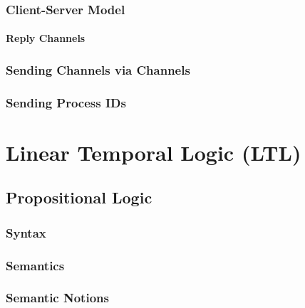 \documentclass[a4paper, 11pt, accentcolor = tud3b]{tudreport}
\begin{document}
            \subsection{Client-Server Model} %

                \subsubsection{Reply Channels} %

            \subsection{Sending Channels via Channels} %

            \subsection{Sending Process IDs} %

    \chapter{Linear Temporal Logic (LTL)} %

        \section{Propositional Logic} %

            \subsection{Syntax} %

            \subsection{Semantics} %

            \subsection{Semantic Notions} %
\end{document}
